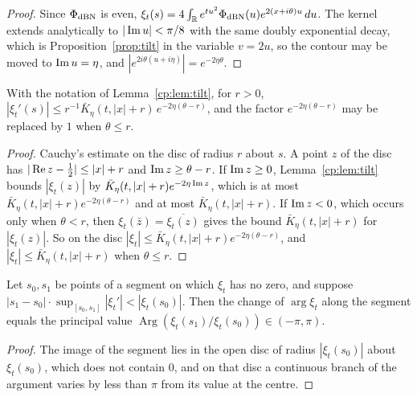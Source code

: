 \begin{proof}
Since $\Phi_{\rm dBN}$ is even, $\xi_t(s)=4\int_{\mathbb{R}} e^{tu^2}\Phi_{\rm dBN}(u)e^{2(x+i\theta)u}\,du$. The kernel extends analytically to $|\operatorname{Im} u|<\pi/8$ with the same doubly exponential decay, which is Proposition~\ref{prop:tilt} in the variable $v=2u$, so the contour may be moved to $\operatorname{Im} u=\eta$, and $|e^{2i\theta(u+i\eta)}|=e^{-2\eta\theta}$.
\end{proof}

\begin{lemma}\label{cp:lem:deriv}
With the notation of Lemma~\ref{cp:lem:tilt}, for $r>0$, $|\xi_t'(s)|\le r^{-1}\bar K_\eta(t,|x|+r)\,e^{-2\eta(\theta-r)}$, and the factor $e^{-2\eta(\theta-r)}$ may be replaced by $1$ when $\theta\le r$.
\end{lemma}

\begin{proof}
Cauchy's estimate on the disc of radius $r$ about $s$. A point $z$ of the disc has $|\operatorname{Re} z-\frac12|\le|x|+r$ and $\operatorname{Im} z\ge\theta-r$. If $\operatorname{Im} z\ge0$, Lemma~\ref{cp:lem:tilt} bounds $|\xi_t(z)|$ by $\bar K_\eta(t,|x|+r)e^{-2\eta\operatorname{Im} z}$, which is at most $\bar K_\eta(t,|x|+r)e^{-2\eta(\theta-r)}$ and at most $\bar K_\eta(t,|x|+r)$. If $\operatorname{Im} z<0$, which occurs only when $\theta<r$, then $\xi_t(\bar z)=\overline{\xi_t(z)}$ gives the bound $\bar K_\eta(t,|x|+r)$ for $|\xi_t(z)|$. So on the disc $|\xi_t|\le\bar K_\eta(t,|x|+r)e^{-2\eta(\theta-r)}$, and $|\xi_t|\le\bar K_\eta(t,|x|+r)$ when $\theta\le r$.
\end{proof}

\begin{lemma}[Grid]\label{cp:lem:grid}
Let $s_0,s_1$ be points of a segment on which $\xi_t$ has no zero, and suppose $|s_1-s_0|\cdot\sup_{[s_0,s_1]}|\xi_t'|<|\xi_t(s_0)|$. Then the change of $\arg\xi_t$ along the segment equals the principal value $\operatorname{Arg}(\xi_t(s_1)/\xi_t(s_0))\in(-\pi,\pi)$.
\end{lemma}

\begin{proof}
The image of the segment lies in the open disc of radius $|\xi_t(s_0)|$ about $\xi_t(s_0)$, which does not contain $0$, and on that disc a continuous branch of the argument varies by less than $\pi$ from its value at the centre.
\end{proof}

